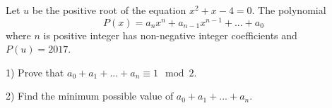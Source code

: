 Let $u$ be the positive root of the equation $x^2+x-4=0$. The polynomial$$P(x)=a_nx^n+a_{n-1}x^{n-1}+...+a_0$$where $n$ is positive integer has non-negative integer coefficients and $P(u)=2017$.

1) Prove that $a_0+a_1+...+a_n\equiv 1\mod 2$.

2) Find the minimum possible value of $a_0+a_1+...+a_n$.